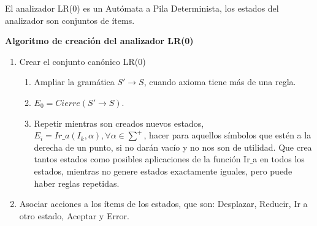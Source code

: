 \documentclass[12pt, twoside, openright]{report} %
\begin{document}
El analizador LR(0) es un Autómata a Pila Determinista, los estados del analizador son conjuntos de ítems.

\textbf{Algoritmo de creación del analizador LR(0)}
\begin{enumerate}
  \item Crear el conjunto canónico LR(0)
  \begin{enumerate}
    \item Ampliar la gramática $S'\rightarrow S$, cuando axioma tiene más de una regla.
    \item $E_0 = Cierre(S'\rightarrow S)$.
    \item Repetir mientras son creados nuevos estados, $E_i = Ir\_a(I_k, \alpha), \forall \alpha \in \sum^+$, hacer para aquellos símbolos que estén a la derecha de un punto, si no darán vacío y no nos son de utilidad. Que crea tantos estados como posibles aplicaciones de la función Ir$\_$a en todos los estados, mientras no genere estados exactamente iguales, pero puede haber reglas repetidas.
  \end{enumerate}
  \item Asociar acciones a los ítems de los estados, que son: Desplazar, Reducir, Ir a otro estado, Aceptar y Error.
\end{enumerate}
\end{document}
